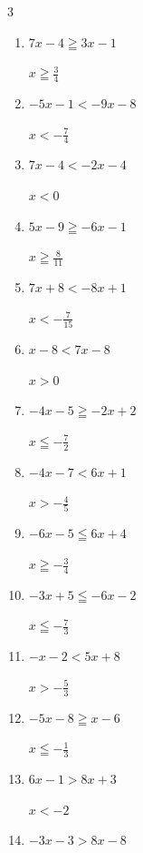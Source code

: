 \begin{multicols}{3}
\begin{enumerate}
        $\displaystyle x<\frac{3}{11}$

  \item $7x-4\geqq 3x-1$

        $\displaystyle x\geqq \frac{3}{4}$

  \item $-5x-1<-9x-8$

        $\displaystyle x<-\frac{7}{4}$

  \item $7x-4<-2x-4$

        $\displaystyle x<0$

  \item $5x-9\geqq -6x-1$

        $\displaystyle x\geqq \frac{8}{11}$

\columnbreak %

  \item $7x+8<-8x+1$

        $\displaystyle x<-\frac{7}{15}$

  \item $x-8<7x-8$

        $\displaystyle x>0$

  \item $-4x-5\geqq -2x+2$

        $\displaystyle x\leqq -\frac{7}{2}$

  \item $-4x-7<6x+1$

        $\displaystyle x>-\frac{4}{5}$

  \item $-6x-5\leqq 6x+4$

        $\displaystyle x\geqq -\frac{3}{4}$

  \item $-3x+5\leqq -6x-2$

        $\displaystyle x\leqq -\frac{7}{3}$

  \item $-x-2<5x+8$

        $\displaystyle x>-\frac{5}{3}$

  \item $-5x-8\geqq x-6$

        $\displaystyle x\leqq -\frac{1}{3}$

  \item $6x-1>8x+3$

        $\displaystyle x<-2$

  \item $-3x-3>8x-8$


\end{enumerate}
\end{multicols}
